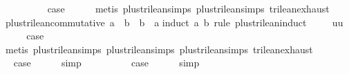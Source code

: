 \begin{isabellebody}
\isamarkupfalse%
\isanewline
\ \ \isamarkupfalse%
\ {}\isanewline
\ \ \isamarkupfalse%
\ \isamarkupfalse%
\ {\isacharquery}case\isanewline
\ \ \ \ \isamarkupfalse%
\ {\isacharparenleft}metis\ plus{\isacharunderscore}trilean{\isachardot}simps{\isacharparenleft}{}{\isacharparenright}\ plus{\isacharunderscore}trilean{\isachardot}simps{\isacharparenleft}{}{\isacharparenright}\ trilean{\isachardot}exhaust{\isacharparenright}\isanewline
{}\isamarkupfalse%
%
\endisatagproof
{\isafoldproof}%
%
\isadelimproof
\isanewline
%
\endisadelimproof
\isanewline
{}\isamarkupfalse%
\ plus{\isacharunderscore}trilean{\isacharunderscore}commutative{\isacharcolon}\ {\isachardoublequoteopen}a\ {\isasymor}\isactrlsub {\isacharquery}\ b\ {\isacharequal}\ b\ {\isasymor}\isactrlsub {\isacharquery}\ a{\isachardoublequoteclose}\isanewline
%
\isadelimproof
%
\endisadelimproof
%
\isatagproof
{}\isamarkupfalse%
{\isacharparenleft}induct\ a\ b\ rule{\isacharcolon}\ plus{\isacharunderscore}trilean{\isachardot}induct{\isacharparenright}\isanewline
\ \ \isamarkupfalse%
\ {\isacharparenleft}{}\ uu{\isacharparenright}\isanewline
\ \ \isamarkupfalse%
\ \isamarkupfalse%
\ {\isacharquery}case\isanewline
\ \ \ \ \isamarkupfalse%
\ {\isacharparenleft}metis\ plus{\isacharunderscore}trilean{\isachardot}simps{\isacharparenleft}{}{\isacharparenright}\ plus{\isacharunderscore}trilean{\isachardot}simps{\isacharparenleft}{}{\isacharparenright}\ plus{\isacharunderscore}trilean{\isachardot}simps{\isacharparenleft}{}{\isacharparenright}\ trilean{\isachardot}exhaust{\isacharparenright}\isanewline
{}\isamarkupfalse%
\isanewline
\ \ \isamarkupfalse%
\ {\isachardoublequoteopen}{}{\isacharunderscore}{}{\isachardoublequoteclose}\isanewline
\ \ \isamarkupfalse%
\ \isamarkupfalse%
\ {\isacharquery}case\isanewline
\ \ \ \ \isamarkupfalse%
\ simp\isanewline
{}\isamarkupfalse%
\isanewline
\ \ \isamarkupfalse%
\ {\isachardoublequoteopen}{}{\isacharunderscore}{}{\isachardoublequoteclose}\isanewline
\ \ \isamarkupfalse%
\ \isamarkupfalse%
\ {\isacharquery}case\isanewline
\ \ \ \ \isamarkupfalse%
\ simp\isanewline
{}\isamarkupfalse%

\end{isabellebody}
